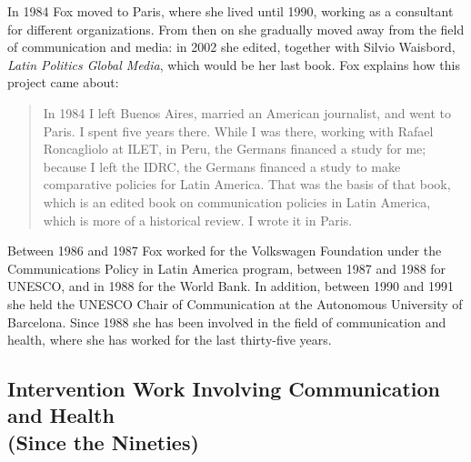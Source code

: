 \documentclass{tufte-handout}
\begin{document}
In 1984 Fox moved to Paris, where she lived until 1990, working as a
consultant for different organizations. From then on she gradually moved
away from the field of communication and media: in 2002 she edited,
together with Silvio Waisbord, \emph{Latin Politics Global Media}, which
would be her last book. Fox explains how this project came about:

\begin{quote}
In 1984 I left Buenos Aires, married an American journalist, and went to
Paris. I spent five years there. While I was there, working with Rafael
Roncagliolo at ILET, in Peru, the Germans financed a study for me;
because I left the IDRC, the Germans financed a study to make
comparative policies for Latin America. That was the basis of that book,
which is an edited book on communication policies in Latin America,
which is more of a historical review. I wrote it in Paris.
\end{quote}

\noindent Between 1986 and 1987 Fox worked for the Volkswagen Foundation under the
Communications Policy in Latin America program, between 1987 and 1988
for UNESCO, and in 1988 for the World Bank. In addition, between 1990
and 1991 she held the UNESCO Chair of Communication at the Autonomous
University of Barcelona. Since 1988 she has been involved in the field
of communication and health, where she has worked for the last
thirty-five years.

\hypertarget{intervention-work-involving-communication-and-health-since-the-nineties}{%
\subsection{Intervention Work Involving
Communication and Health\\\noindent (Since the
Nineties)}\label{intervention-work-involving-communication-and-health-since-the-nineties}}
\end{document}
